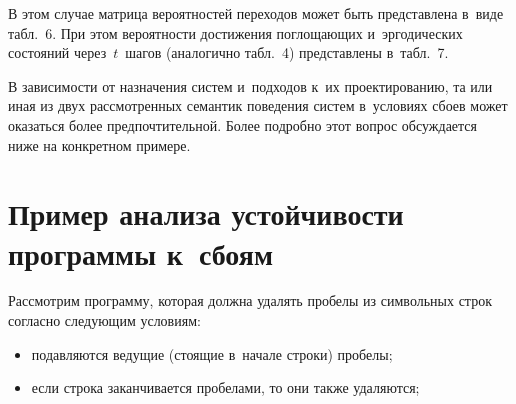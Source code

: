 \begin{multicols}{2}
В этом случае матрица вероятностей переходов может быть представлена 
в~виде табл.~6.
При этом вероятности достижения поглощающих и~эргодических состояний 
через~$t$~шагов (аналогично табл.~4) представлены в~табл.~7.



     В зависимости от назначения систем и~подходов к~их проектированию, та 
или иная из двух рассмотренных семантик поведения систем в~условиях сбоев 
может оказаться более предпочтительной. Более подробно этот вопрос 
обсуждается ниже на конкретном примере.

\section{Пример анализа устойчивости программы к~сбоям}

     Рассмотрим программу, которая должна удалять пробелы из символьных 
строк согласно следующим условиям:
     \begin{itemize}
     \item  подавляются ведущие (стоящие в~начале строки) пробелы;
\item если строка заканчивается пробелами, то они также удаляются;
\end{itemize}

\pagebreak

\end{multicols}

\begin{figure*} %
        \vspace*{1pt}
\begin{center}
\mbox{%
\epsfxsize=134.554mm
}
\end{center}
\vspace*{-9pt}
\vspace*{6pt}
\end{figure*}

